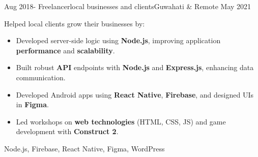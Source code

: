 \begin{experiences}
  \emptySeparator
  \experience
    {Aug 2018-} {Freelancer}{local businesses and clients}{Guwahati \& Remote}
    {May 2021} {
        \par Helped local clients grow their businesses by:
        \begin{itemize}
            \item Developed server-side logic using \textbf{Node.js}, improving application \textbf{performance} and \textbf{scalability}.
            \item Built robust \textbf{API} endpoints with \textbf{Node.js} and \textbf{Express.js}, enhancing data communication.
            \item Developed Android apps using \textbf{React Native}, \textbf{Firebase}, and designed UIs in \textbf{Figma}.
            \item Led workshops on \textbf{web technologies} (HTML, CSS, JS) and game development with \textbf{Construct 2}.
        \end{itemize}
    }
    {Node.js, Firebase, React Native, Figma, WordPress}

  \emptySeparator
 

\end{experiences}
